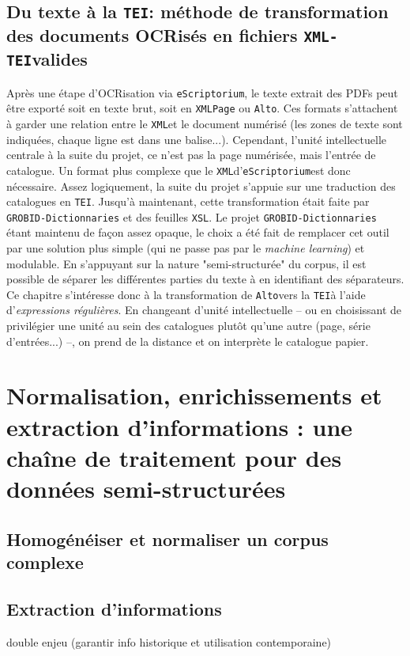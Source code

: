 \documentclass[a4paper, 12pt, twoside]{book}
\newcommand{\alto}{\texttt{Alto}}
\newcommand{\escr}{\texttt{eScriptorium}}
\newcommand{\rgx}{\textit{expressions régulières}}
\newcommand{\tei}{\texttt{TEI}}
\newcommand{\xml}{\texttt{XML}}
\newcommand{\xmltei}{\texttt{XML-TEI}}
\newcommand{\xsl}{\texttt{XSL}}
\begin{document}
\chapter{Du texte à la \tei : méthode de transformation des documents OCRisés en fichiers \xmltei valides}
Après une étape d'OCRisation via \escr, le texte extrait des PDFs peut être exporté soit en texte brut, soit en \xml \texttt{Page} ou \alto. Ces formats s'attachent à garder une relation entre le \xml et le document numérisé (les zones de texte sont indiquées, chaque ligne est dans une balise...). Cependant, l'unité intellectuelle centrale à la suite du projet, ce n'est pas la page numérisée, mais l'entrée de catalogue. Un format plus complexe que le \xml d'\escr est donc nécessaire. Assez logiquement, la suite du projet s'appuie sur une traduction des catalogues en \tei. Jusqu'à maintenant, cette transformation était faite par \texttt{GROBID-Dictionnaries} et des feuilles \xsl. Le projet \texttt{GROBID-Dictionnaries} étant maintenu de façon assez opaque, le choix a été fait de remplacer cet outil par une solution plus simple (qui ne passe pas par le \textit{machine learning}) et modulable. En s'appuyant sur la nature "semi-structurée" du corpus, il est possible de séparer les différentes parties du texte à en identifiant des séparateurs. Ce chapitre s'intéresse donc à la transformation de \alto vers la \tei à l'aide d'\rgx. En changeant d'unité intellectuelle -- ou en choisissant de privilégier une unité au sein des catalogues plutôt qu'une autre (page, série d'entrées...) --, on prend de la distance et on interprète le catalogue papier.




\part{Normalisation, enrichissements et extraction d'informations : une chaîne de traitement pour des données semi-structurées}
\chapter{Homogénéiser et normaliser un corpus complexe}

\chapter{Extraction d'informations}
double enjeu (garantir info historique et utilisation contemporaine)
\end{document}
